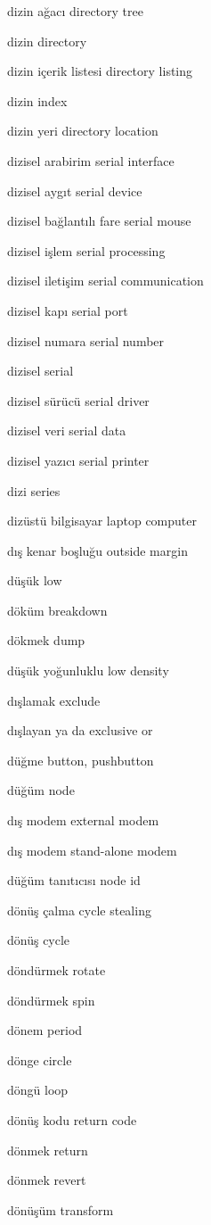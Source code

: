 \documentclass[12pt,fleqn]{article}\usepackage{../../common}
\begin{document}
dizin ağacı directory tree

dizin directory

dizin içerik listesi directory listing

dizin index

dizin yeri directory location

dizisel arabirim serial interface

dizisel aygıt serial device

dizisel bağlantılı fare serial mouse

dizisel işlem serial processing

dizisel iletişim serial communication

dizisel kapı serial port

dizisel numara serial number

dizisel serial

dizisel sürücü serial driver

dizisel veri serial data

dizisel yazıcı serial printer

dizi series

dizüstü bilgisayar laptop computer

dış kenar boşluğu outside margin

düşük low

döküm breakdown

dökmek dump

düşük yoğunluklu low density

dışlamak exclude

dışlayan ya da exclusive or

düğme button, pushbutton

düğüm node

dış modem external modem

dış modem stand-alone modem

düğüm tanıtıcısı node id

dönüş çalma cycle stealing

dönüş cycle

döndürmek rotate

döndürmek spin

dönem period

dönge circle

döngü loop

dönüş kodu return code

dönmek return

dönmek revert

dönüşüm transform
\end{document}
